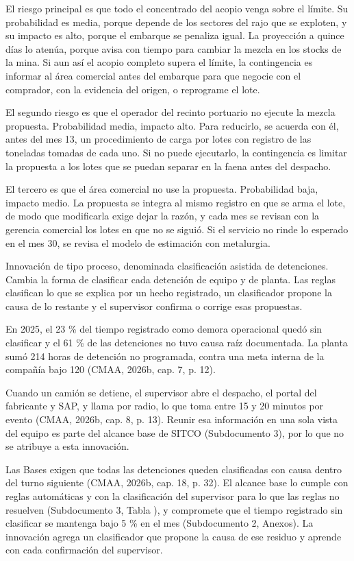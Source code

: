 \documentclass[subdoc]{../../comun/overfore}
\begin{document}
El riesgo principal es que todo el concentrado del acopio venga sobre el límite. Su probabilidad es media, porque depende de los sectores del rajo que se exploten, y su impacto es alto, porque el embarque se penaliza igual. La proyección a quince días lo atenúa, porque avisa con tiempo para cambiar la mezcla en los stocks de la mina. Si aun así el acopio completo supera el límite, la contingencia es informar al área comercial antes del embarque para que negocie con el comprador, con la evidencia del origen, o reprograme el lote.

El segundo riesgo es que el operador del recinto portuario no ejecute la mezcla propuesta. Probabilidad media, impacto alto. Para reducirlo, se acuerda con él, antes del mes 13, un procedimiento de carga por lotes con registro de las toneladas tomadas de cada uno. Si no puede ejecutarlo, la contingencia es limitar la propuesta a los lotes que se puedan separar en la faena antes del despacho.

El tercero es que el área comercial no use la propuesta. Probabilidad baja, impacto medio. La propuesta se integra al mismo registro en que se arma el lote, de modo que modificarla exige dejar la razón, y cada mes se revisan con la gerencia comercial los lotes en que no se siguió. Si el servicio no rinde lo esperado en el mes 30, se revisa el modelo de estimación con metalurgia.

Innovación de tipo proceso, denominada clasificación asistida de detenciones. Cambia la forma de clasificar cada detención de equipo y de planta. Las reglas clasifican lo que se explica por un hecho registrado, un clasificador propone la causa de lo restante y el supervisor confirma o corrige esas propuestas.

En 2025, el 23 \% del tiempo registrado como demora operacional quedó sin clasificar y el 61 \% de las detenciones no tuvo causa raíz documentada. La planta sumó 214 horas de detención no programada, contra una meta interna de la compañía bajo 120 (CMAA, 2026b, cap. 7, p. 12).

Cuando un camión se detiene, el supervisor abre el despacho, el portal del fabricante y SAP, y llama por radio, lo que toma entre 15 y 20 minutos por evento (CMAA, 2026b, cap. 8, p. 13). Reunir esa información en una sola vista del equipo es parte del alcance base de SITCO (Subdocumento 3), por lo que no se atribuye a esta innovación.

Las Bases exigen que todas las detenciones queden clasificadas con causa dentro del turno siguiente (CMAA, 2026b, cap. 18, p. 32). El alcance base lo cumple con reglas automáticas y con la clasificación del supervisor para lo que las reglas no resuelven (Subdocumento 3, Tabla ), y compromete que el tiempo registrado sin clasificar se mantenga bajo 5 \% en el mes (Subdocumento 2, Anexos). La innovación agrega un clasificador que propone la causa de ese residuo y aprende con cada confirmación del supervisor.
\end{document}
